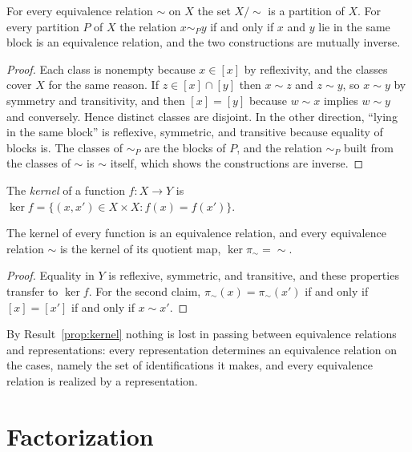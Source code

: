 \begin{established}\label{thm:partitions}
For every equivalence relation $\sim$ on $X$ the set $X/{\sim}$ is a partition of $X$. For every partition $P$ of $X$ the relation $x\sim_P y$ if and only if $x$ and $y$ lie in the same block is an equivalence relation, and the two constructions are mutually inverse.
\end{established}
\begin{proof}
Each class is nonempty because $x\in[x]$ by reflexivity, and the classes cover $X$ for the same reason. If $z\in[x]\cap[y]$ then $x\sim z$ and $z\sim y$, so $x\sim y$ by symmetry and transitivity, and then $[x]=[y]$ because $w\sim x$ implies $w\sim y$ and conversely. Hence distinct classes are disjoint. In the other direction, ``lying in the same block'' is reflexive, symmetric, and transitive because equality of blocks is. The classes of $\sim_P$ are the blocks of $P$, and the relation $\sim_P$ built from the classes of $\sim$ is $\sim$ itself, which shows the constructions are inverse.
\end{proof}

\begin{definition}[Kernel]
The \emph{kernel} of a function $f:X\to Y$ is $\ker f=\{(x,x')\in X\times X : f(x)=f(x')\}$.
\end{definition}

\begin{established}[Kernels]\label{prop:kernel}
The kernel of every function is an equivalence relation, and every equivalence relation $\sim$ is the kernel of its quotient map, $\ker\pi_{\sim}={\sim}$.
\end{established}
\begin{proof}
Equality in $Y$ is reflexive, symmetric, and transitive, and these properties transfer to $\ker f$. For the second claim, $\pi_\sim(x)=\pi_\sim(x')$ if and only if $[x]=[x']$ if and only if $x\sim x'$.
\end{proof}

By Result~\ref{prop:kernel} nothing is lost in passing between equivalence relations and representations: every representation determines an equivalence relation on the cases, namely the set of identifications it makes, and every equivalence relation is realized by a representation.

\section{Factorization}

